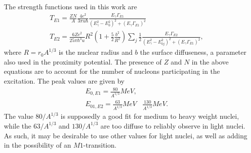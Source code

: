 The strength functions used in this work are
\begin{equation}
\begin{aligned}
T_{E1} =  \frac{ZN}{A}\frac{4e^2}{3\pi u\hbar} \frac{E_\gamma \Gamma_{E1}}{(E_\gamma^2 -E^2_0)^2+(E_\gamma \Gamma_{E1})^2}  \\
T_{E2} =  \frac{6Z e^2}{25\pi\hbar^3 u}R^2\left(1+\frac{5}{2}\frac{b^2}{R^2}\right)  \sum_j \frac{1}{2}\frac{E_\gamma \Gamma_{E2}}{(E_{\gamma}^2 -E^2_{0j})^2+(E_\gamma \Gamma_{E1})^2},
\end{aligned}
\end{equation}
where $R=r_0 A^{1/3}$ is the nuclear radius and $b$ the surface diffuseness, a parameter also used in the proximity potential. The presence of $Z$ and $N$ in the above equations are to account for the number of nucleons participating in the excitation\cite{Chomaz:1997}.
The peak values are given by
\begin{equation}
\begin{aligned}
E_{0,E1} = \frac{80}{A^{1/3}}\unit{MeV}, &\\
E_{01,E2} = \frac{63}{A^{1/3}}\unit{MeV} &\frac{130}{A^{1/3}}\unit{MeV}.
\end{aligned}
\end{equation}
The value $80/A^{1/3}$ is supposedly a good fit for medium to heavy weight nuclei\cite{Chomaz:1997}, while the $63/A^{1/3}$ and $130/A^{1/3}$ are too diffuse to reliably observe in light nuclei\cite{PhysRevLett.34.748}\cite{speth1991electric}. As such, it may be desirable to use other values for light nuclei, as well as adding in the possibility of an $M1$-transition.





